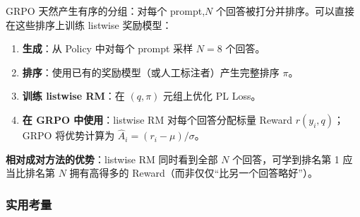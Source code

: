 \begin{keybox}[与 GRPO 的集成]
GRPO 天然产生有序的分组：对每个 prompt,$N$ 个回答被打分并排序。可以直接在这些排序上训练 listwise 奖励模型：

\begin{enumerate}
  \item \textbf{生成}：从 Policy 中对每个 prompt 采样 $N=8$ 个回答。
  \item \textbf{排序}：使用已有的奖励模型（或人工标注者）产生完整排序 $\pi$。
  \item \textbf{训练 listwise RM}：在 $(q, \pi)$ 元组上优化 PL Loss。
  \item \textbf{在 GRPO 中使用}：listwise RM 对每个回答分配标量 Reward $r(y_i, q)$；GRPO 将优势计算为 $\hat{A}_i = (r_i - \mu) / \sigma$。
\end{enumerate}

\textbf{相对成对方法的优势}：listwise RM 同时看到全部 $N$ 个回答，可学到排名第 1 应当比排名第 $N$ 拥有高得多的 Reward（而非仅仅“比另一个回答略好”）。
\end{keybox}

\subsubsection*{实用考量}
\label{practical-considerations}

